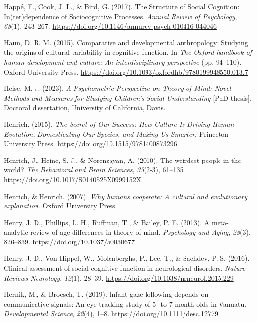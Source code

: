 \documentclass[
]{scrbook}
\newlength{\cslhangindent}
\newenvironment{CSLReferences}[2] %
 {\begin{list}{}{%
  \setlength{\itemindent}{0pt}
  \setlength{\leftmargin}{0pt}
  \setlength{\parsep}{0pt}
  \ifodd #1
   \setlength{\leftmargin}{\cslhangindent}
   \setlength{\itemindent}{-1\cslhangindent}
  \fi
  \setlength{\itemsep}{#2\baselineskip}}}
 {\end{list}}
\begin{document}
\begin{CSLReferences}{1}{0}
Happé, F., Cook, J. L., \& Bird, G. (2017). The {Structure} of {Social Cognition}: {In}(ter)dependence of {Sociocognitive Processes}. \emph{Annual Review of Psychology}, \emph{68}(1), 243--267. \url{https://doi.org/10.1146/annurev-psych-010416-044046}

Haun, D. B. M. (2015). Comparative and developmental anthropology: {Studying} the origins of cultural variability in cognitive function. In \emph{The {Oxford} handbook of human development and culture: {An} interdisciplinary perspective} (pp. 94--110). Oxford University Press. \url{https://doi.org/10.1093/oxfordhb/9780199948550.013.7}

Heise, M. J. (2023). \emph{A {Psychometric Perspective} on {Theory} of {Mind}: {Novel Methods} and {Measures} for {Studying Children}'s {Social Understanding}} {[}PhD thesis{]}. Doctoral dissertation, University of California, Davis.

Henrich. (2015). \emph{The {Secret} of {Our Success}: {How Culture Is Driving Human Evolution}, {Domesticating Our Species}, and {Making Us Smarter}}. Princeton University Press. \url{https://doi.org/10.1515/9781400873296}

Henrich, J., Heine, S. J., \& Norenzayan, A. (2010). The weirdest people in the world? \emph{The Behavioral and Brain Sciences}, \emph{33}(2-3), 61--135. \url{https://doi.org/10.1017/S0140525X0999152X}

Henrich, \& Henrich. (2007). \emph{Why humans cooperate: {A} cultural and evolutionary explanation}. Oxford University Press.

Henry, J. D., Phillips, L. H., Ruffman, T., \& Bailey, P. E. (2013). A meta-analytic review of age differences in theory of mind. \emph{Psychology and Aging}, \emph{28}(3), 826--839. \url{https://doi.org/10.1037/a0030677}

Henry, J. D., Von Hippel, W., Molenberghs, P., Lee, T., \& Sachdev, P. S. (2016). Clinical assessment of social cognitive function in neurological disorders. \emph{Nature Reviews Neurology}, \emph{12}(1), 28--39. \url{https://doi.org/10.1038/nrneurol.2015.229}

Hernik, M., \& Broesch, T. (2019). Infant gaze following depends on communicative signals: {An} eye-tracking study of 5- to 7-month-olds in {Vanuatu}. \emph{Developmental Science}, \emph{22}(4), 1--8. \url{https://doi.org/10.1111/desc.12779}


\end{CSLReferences}
\end{document}
